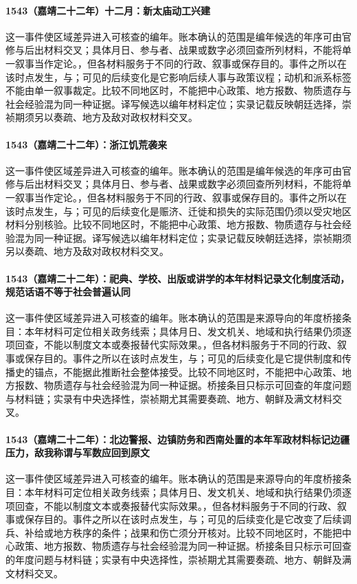 \paragraph{1543（嘉靖二十二年）十二月：新太庙动工兴建} 这一事件使区域差异进入可核查的编年。账本确认的范围是编年候选的年序可由官修与后出材料交叉；具体月日、参与者、战果或数字必须回查所列材料，不能将单一叙事当作定论。，但各材料服务于不同的行政、叙事或保存目的。事件之所以在该时点发生，与；可见的后续变化是它影响后续人事与政策议程；动机和派系标签不能由单一叙事裁定。比较不同地区时，不能把中心政策、地方报数、物质遗存与社会经验混为同一种证据。译写候选以编年材料定位；实录记载反映朝廷选择，崇祯期须另以奏疏、地方及敌对政权材料交叉。

\paragraph{1543（嘉靖二十二年）：浙江饥荒袭来} 这一事件使区域差异进入可核查的编年。账本确认的范围是编年候选的年序可由官修与后出材料交叉；具体月日、参与者、战果或数字必须回查所列材料，不能将单一叙事当作定论。，但各材料服务于不同的行政、叙事或保存目的。事件之所以在该时点发生，与；可见的后续变化是赈济、迁徙和损失的实际范围仍须以受灾地区材料分别核验。比较不同地区时，不能把中心政策、地方报数、物质遗存与社会经验混为同一种证据。译写候选以编年材料定位；实录记载反映朝廷选择，崇祯期须另以奏疏、地方及敌对政权材料交叉。

\paragraph{1543（嘉靖二十二年）：祀典、学校、出版或讲学的本年材料记录文化制度活动，规范话语不等于社会普遍认同} 这一事件使区域差异进入可核查的编年。账本确认的范围是来源导向的年度桥接条目：本年材料可定位相关政务线索；具体月日、发文机关、地域和执行结果仍须逐项回查，不能以制度文本或奏报替代实际效果。，但各材料服务于不同的行政、叙事或保存目的。事件之所以在该时点发生，与；可见的后续变化是它提供制度和传播史的锚点，不能据此推断社会整体接受。比较不同地区时，不能把中心政策、地方报数、物质遗存与社会经验混为同一种证据。桥接条目只标示可回查的年度问题与材料链；实录有中央选择性，崇祯期尤其需要奏疏、地方、朝鲜及满文材料交叉。

\paragraph{1543（嘉靖二十二年）：北边警报、边镇防务和西南处置的本年军政材料标记边疆压力，敌我称谓与军数应回到原文} 这一事件使区域差异进入可核查的编年。账本确认的范围是来源导向的年度桥接条目：本年材料可定位相关政务线索；具体月日、发文机关、地域和执行结果仍须逐项回查，不能以制度文本或奏报替代实际效果。，但各材料服务于不同的行政、叙事或保存目的。事件之所以在该时点发生，与；可见的后续变化是它改变了后续调兵、补给或地方秩序的条件；战果和伤亡须分开核对。比较不同地区时，不能把中心政策、地方报数、物质遗存与社会经验混为同一种证据。桥接条目只标示可回查的年度问题与材料链；实录有中央选择性，崇祯期尤其需要奏疏、地方、朝鲜及满文材料交叉。

